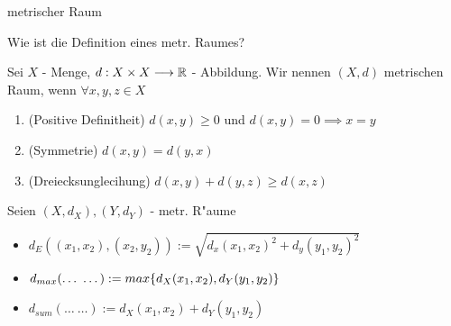 \documentclass[class=article, crop=false]{standalone}
\begin{document}
\begin{zettel}{metrischer Raum}
\begin{flashcard}
\begin{question}
    Wie ist die Definition eines metr. Raumes?
\end{question}
\begin{definition}
    Sei $X$ - Menge, $d:X \times X \longrightarrow \mathbb{R}$ - Abbildung. Wir nennen $(X,d)$ metrischen Raum, wenn $\forall x,y,z \in X$ 
    \begin{enumerate}
        \item (Positive Definitheit) $d(x,y) \geq 0$ und $d(x,y)= 0 \implies x = y$ 
        \item (Symmetrie) $d(x,y) = d(y,x)$ 
        \item (Dreiecksunglecihung) $d(x,y) + d(y,z) \geq d(x,z)$ 
    \end{enumerate}
\end{definition}
\end{flashcard}

\begin{example}[Metriken]
Seien $ (X,d_X) , (Y,d_Y)  $ - metr. R"aume
\begin{itemize}
    \item $d_E ( (x_1,x_2) , (x_2,y_2)) := \sqrt{d_x (x_1,x_2)^2 + d_y (y_1,y_2)^2  }$ 
    \item $d_{max} (\dots\ \dots) := max \set{ d_X (x_1,x_2) , d_Y  (y_1,y_2) }$
    \item $d_{sum} (\dots\ \dots):= d_X (x_1,x_2) +  d_Y (y_1,y_2) $
\end{itemize}
\end{example}    

\end{zettel}
\end{document}

